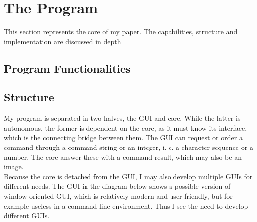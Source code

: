 \documentclass[10pt,a4paper,titlepage]{article}
\begin{document}
	\section{The Program}
	This section represents the core of my paper. The capabilities, structure and implementation are discussed in depth
	\subsection{Program Functionalities}
	\subsection{Structure}
	My program is separated in two halves, the GUI and core. While the latter is autonomous, the former is dependent on the core, as it must know its interface, which is the connecting bridge between them. The GUI can request or order a command through a command string or an integer, i. e. a character sequence or a number. The core answer these with a command result, which may also be an image.\\
	Because the core is detached from the GUI, I may also develop multiple GUIs for different needs. The GUI in the diagram below shows a possible version of window-oriented GUI, which is relatively modern and user-friendly, but for example useless in a command line environment. Thus I see the need to develop different GUIs.
	
\end{document}
